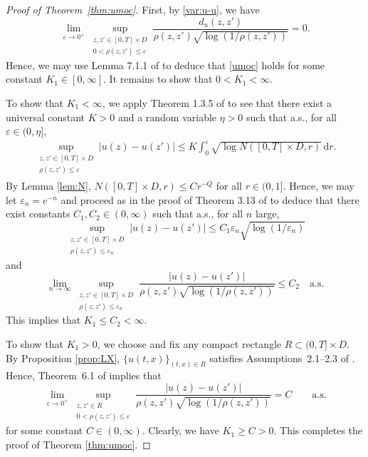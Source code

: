 \documentclass[reqno]{amsart}
\renewcommand{\d}{\mathrm d}
\newcommand{\1}{\mathbf 1}
\numberwithin{equation}{section}
\theoremstyle{definition}
\begin{document}
\begin{proof}[Proof of Theorem~\ref{thm:umoc}]
First, by \eqref{var:u-u}, we have
\[
	\lim_{\varepsilon\to0^+} \sup_{\substack{z,z'\in [0,T]\times D\\ 0<\rho(z,z') \le \varepsilon}} \frac{d_u(z,z')}{\rho(z,z') \sqrt{\log(1/\rho(z,z'))}} = 0.
\]
Hence, we may use Lemma 7.1.1 of \cite{MR} to deduce that \eqref{umoc} holds for some constant $K_1 \in [0,\infty]$.
It remains to show that $0<K_1<\infty$.

To show that $K_1<\infty$, we apply Theorem 1.3.5 of \cite{AT} to see that there exist a universal constant $K>0$ and a random variable $\eta>0$ such that a.s., for all $\varepsilon \in (0,\eta]$,
\begin{align*}
	\sup_{\substack{z,z'\in [0,T]\times D\\\rho(z,z') \le \varepsilon}} |u(z)-u(z')| \le K \int_0^\varepsilon \sqrt{\log N([0,T]\times D, r)} \, \d r.
\end{align*}
By Lemma \ref{lem:N}, $N([0,T]\times D, r) \le C r^{-Q}$ for all $r \in (0,1]$.
Hence, we may let $\varepsilon_n = e^{-n}$ and proceed as in the proof of Theorem 3.13 of \cite{HL26} to deduce that there exist constants $C_1, C_2 \in (0,\infty)$ such that a.s., for all $n$ large,
\[
	\sup_{\substack{z,z'\in [0,T]\times D\\\rho(z,z') \le \varepsilon_n}} |u(z)-u(z')| 
	\le C_1 \varepsilon_n \sqrt{\log(1/\varepsilon_n)}
\]
and
\[
	\lim_{n \to \infty} \sup_{\substack{z,z'\in [0,T]\times D\\\rho(z,z') \le \varepsilon_n}} \frac{|u(z)-u(z')|}{\rho(z,z')\sqrt{\log(1/\rho(z,z'))}} \le C_2 \quad \text{a.s.}
\]
This implies that $K_1 \le C_2 <\infty$.

To show that $K_1>0$, we choose and fix any compact rectangle $R \subset (0,T] \times D$.
By Proposition \ref{prop:LX}, $\{u(t,x)\}_{(t,x) \in R}$ satisfies Assumptions~2.1--2.3 of \cite{LX23}.
Hence, Theorem~6.1 of \cite{LX23} implies that
\[
    \lim_{\varepsilon\to0^+}
    \sup_{\substack{z,z'\in R\\0<\rho(z,z')\le\varepsilon}}
    \frac{|u(z)-u(z')|}
    {\rho(z,z')\sqrt{\log(1/\rho(z,z'))}}
    =
    C
    \qquad\text{a.s.}
\]
for some constant $C \in (0,\infty)$.
Clearly, we have $K_1 \ge C>0$.
This completes the proof of Theorem \ref{thm:umoc}.
\end{proof}
\end{document}
